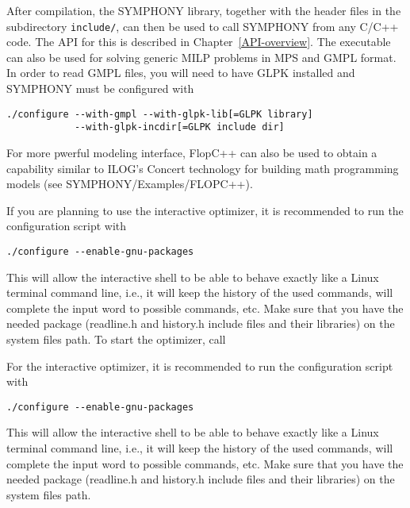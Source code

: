 After compilation, the SYMPHONY library, together with the header files in the
subdirectory \texttt{include/}, can then be used to call SYMPHONY from any
C/C++ code. The API for this is described in Chapter~\ref{API-overview}. The
executable can also be used for solving generic MILP problems in MPS and GMPL
format. In order to read GMPL files, you will need to have GLPK installed and
SYMPHONY must be configured with
\begin{verbatim}
./configure --with-gmpl --with-glpk-lib[=GLPK library] 
            --with-glpk-incdir[=GLPK include dir] 
\end{verbatim}

For more pwerful modeling interface, FlopC++ can also be used to obtain a
capability similar to ILOG's Concert technology for building math programming
models (see SYMPHONY/Examples/FLOPC++). 

If you are planning to use the interactive optimizer, it is recommended to run
the configuration script with
\begin{verbatim}
./configure --enable-gnu-packages 
\end{verbatim}
This will allow the interactive shell to be able to behave exactly like 
a Linux terminal command line, i.e., it will keep the history of the used 
commands, will complete the input word to possible commands, etc. Make sure
that you have the needed package (readline.h and history.h include files 
and their libraries) on the system files path. To start the optimizer, call 

For the interactive optimizer, it is recommended to run the configuration 
script with 
\begin{verbatim}
./configure --enable-gnu-packages 
\end{verbatim}
This will allow the interactive shell to be able to behave exactly like 
a Linux terminal command line, i.e., it will keep the history of the used 
commands, will complete the input word to possible commands, etc. Make sure
that you have the needed package (readline.h and history.h include files 
and their libraries) on the system files path. 

